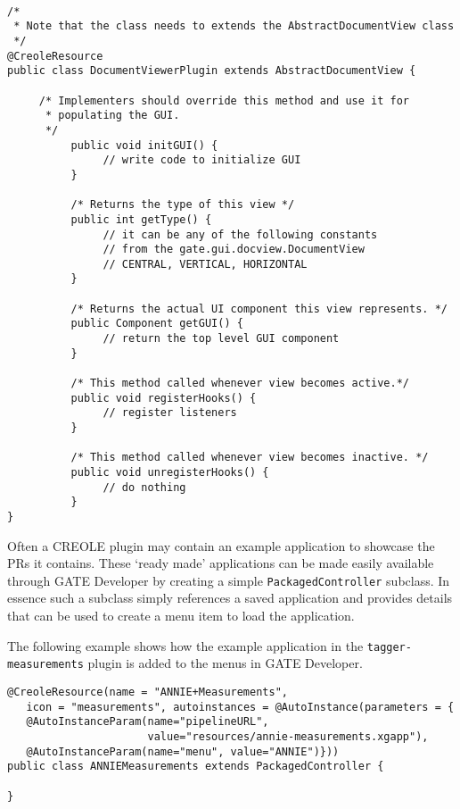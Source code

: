 \begin{lstlisting}

/*
 * Note that the class needs to extends the AbstractDocumentView class
 */
@CreoleResource
public class DocumentViewerPlugin extends AbstractDocumentView {

     /* Implementers should override this method and use it for
      * populating the GUI.
      */
          public void initGUI() {
               // write code to initialize GUI   
          }

          /* Returns the type of this view */
          public int getType() {
               // it can be any of the following constants 
               // from the gate.gui.docview.DocumentView
               // CENTRAL, VERTICAL, HORIZONTAL
          }

          /* Returns the actual UI component this view represents. */
          public Component getGUI() {
               // return the top level GUI component 
          }

          /* This method called whenever view becomes active.*/
          public void registerHooks() {
               // register listeners
          }

          /* This method called whenever view becomes inactive. */
          public void unregisterHooks() {
               // do nothing
          }
}
\end{lstlisting}


Often a CREOLE plugin may contain an example application to showcase the
PRs it contains. These `ready made' applications can be made easily available
through GATE Developer by creating a simple {\tt PackagedController} subclass.
In essence such a subclass simply references a saved application and provides
details that can be used to create a menu item to load the application.

The following example shows how the example application in the
{\tt tagger-measurements} plugin is added to the menus in GATE Developer.

\begin{lstlisting}
@CreoleResource(name = "ANNIE+Measurements",
   icon = "measurements", autoinstances = @AutoInstance(parameters = {
   @AutoInstanceParam(name="pipelineURL",
                      value="resources/annie-measurements.xgapp"),
   @AutoInstanceParam(name="menu", value="ANNIE")}))
public class ANNIEMeasurements extends PackagedController {

}
\end{lstlisting}

